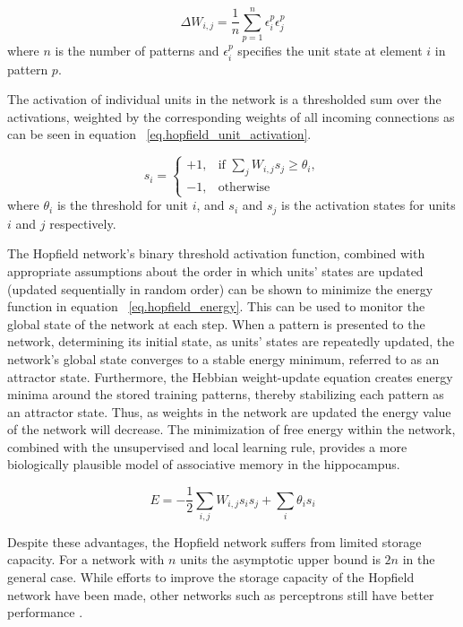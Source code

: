 \begin{equation}
\Delta W_{i,j} = \frac{1}{n} \sum\limits_{p=1}^n \epsilon_{i}^{p} \epsilon_{j}^{p} \label{eq.hopfieldnet_learning_rule}
\end{equation}
where $n$ is the number of patterns and $\epsilon_{i}^{p}$ specifies the unit state at element $i$ in pattern $p$.

The activation of individual units in the network is a thresholded sum over the activations, 
weighted by the corresponding weights of all incoming connections as 
can be seen in equation ~\ref{eq.hopfield_unit_activation}.

\begin{equation}
s_i = 
\begin{cases}
+1, & \text{if } \sum_{j} W_{i,j}s_j \geq \theta_{i}, \\ 
-1, & \text{otherwise}
\end{cases}
\label{eq.hopfield_unit_activation}
\end{equation}
where $\theta_i$ is the threshold for unit $i$, and $s_i$ and $s_j$ is the 
activation states for units $i$ and $j$ respectively.

The Hopfield network's binary threshold activation function, 
combined with appropriate assumptions about the order in which 
units' states are updated (updated sequentially in random order) 
can be shown to minimize the energy function in 
equation ~\ref{eq.hopfield_energy}. 
This can be used 
to monitor the global state of the network at each step. 
When a pattern is presented to the network, determining its initial state, as units' 
states are repeatedly updated, the network's global state converges to a stable energy 
minimum, referred to as an attractor state. 
Furthermore, the Hebbian weight-update equation creates energy minima around 
the stored training patterns, thereby stabilizing each pattern as an attractor state. 
Thus, as weights in the network 
are updated the energy value of the network will decrease. 
The minimization of free energy within the network, combined with the 
unsupervised and local learning rule, provides a more 
biologically plausible model of associative memory in the hippocampus.

\begin{equation}
E = - \frac{1}{2} \sum_{i,j} W_{i,j}s_{i}s_{j} + \sum_{i} \theta_{i}s_{i} \label{eq.hopfield_energy}
\end{equation}

Despite these advantages, the Hopfield network 
suffers from limited storage capacity. 
For a network with $n$ units the asymptotic upper bound is $2n$ in 
the general case. 
While efforts to improve the storage capacity of the Hopfield network have been made, 
other networks such as perceptrons still have better performance \citep{hopfield-memcapacity}.

